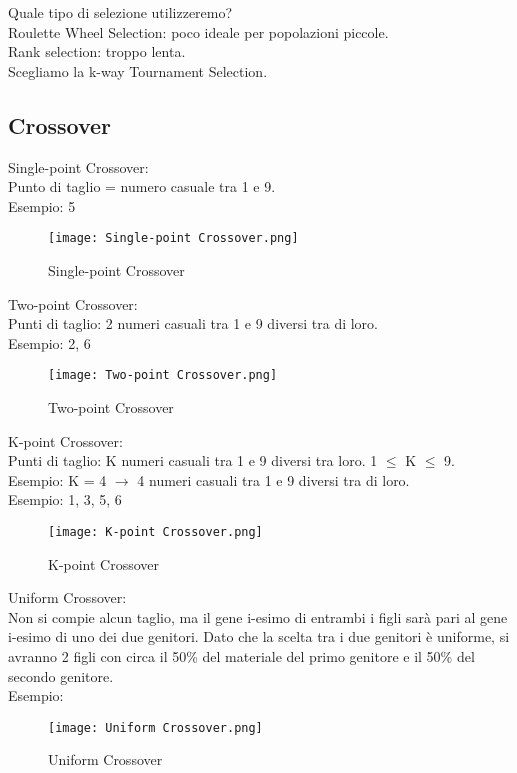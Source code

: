 \documentclass[10pt,a4paper]{article}
\begin{document}
    Quale tipo di selezione utilizzeremo?\\
    Roulette Wheel Selection: poco ideale per popolazioni piccole.\\
    Rank selection: troppo lenta.\\
    Scegliamo la k-way Tournament Selection.\\
    
  
    \subsection{Crossover}
    \label{Crossover}
    Single-point Crossover:\\
    Punto di taglio  = numero casuale tra 1 e 9.\\
    Esempio: 5
    \begin{figure}[h!]
      \centering
      \caption{Single-point Crossover}
      \texttt{[image: Single-point Crossover.png]}
      \label{Single-pointCrossover}
    \end{figure}
    
    
    Two-point Crossover:\\
    Punti di taglio: 2 numeri casuali tra 1 e 9 diversi tra di loro.\\
    Esempio: 2, 6
    \begin{figure}[h!]
      \centering
      \caption{Two-point Crossover}
      \texttt{[image: Two-point Crossover.png]}
      \label{Two-pointCrossover}
    \end{figure}
    
    \newpage
    
    K-point Crossover:\\
    Punti di taglio: K numeri casuali tra 1 e 9 diversi tra loro. 1 $\leq$ K $\leq$ 9.\\
    Esempio: K = 4 $\rightarrow$ 4 numeri casuali tra 1 e 9 diversi tra di loro.\\
    Esempio: 1, 3, 5, 6
    \begin{figure}[h!]
      \centering
      \caption{K-point Crossover}
      \texttt{[image: K-point Crossover.png]}
      \label{K-pointCrossover}
    \end{figure}
    
    Uniform Crossover:\\
    Non si compie alcun taglio, ma il gene i-esimo di entrambi i figli sarà pari al gene i-esimo di uno 
    dei due genitori. Dato che la scelta tra i due genitori è uniforme, si avranno 2 figli 
    con circa il 50\% del materiale del primo genitore e il 50\% del secondo genitore.\\
    Esempio:
    \begin{figure}[h!]
      \centering
      \caption{Uniform Crossover}
      \texttt{[image: Uniform Crossover.png]}
      \label{UniformCrossover}
    \end{figure}
    
\end{document}
